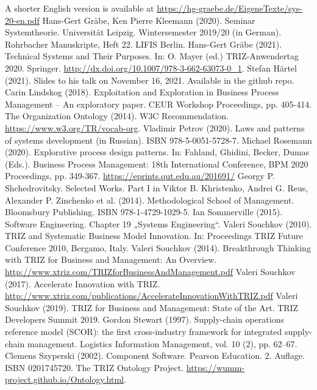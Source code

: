 \documentclass[11pt,a4paper]{article}
\begin{document}
\begin{thebibliography}{xxx}
  A shorter English version is available at
  \url{https://hg-graebe.de/EigeneTexte/sys-20-en.pdf}
 Hans-Gert Gräbe, Ken Pierre Kleemann (2020). Seminar
  Systemtheorie. Universität Leipzig. Wintersemester 2019/20 (in German).
  Rohrbacher Manuskripte, Heft 22. LIFIS Berlin.
 Hans-Gert Gräbe (2021). Technical Systems and Their
  Purposes. In: O. Mayer (ed.) TRIZ-Anwendertag 2020. Springer.
  \url{http://dx.doi.org/10.1007/978-3-662-63073-0_1}.
 Stefan Härtel (2021). Slides to his talk on November 16,
  2021.  Available in the github repo.
 Carin Lindskog (2018). Exploitation and Exploration in
  Business Process Management – An exploratory paper. CEUR Workshop
  Proceedings, pp. 405-414.
 The Organization Ontology (2014). W3C Recommendation.
  \url{https://www.w3.org/TR/vocab-org}.
 Vladimir Petrov (2020). Laws and patterns of systems
  development (in Russian). ISBN 978-5-0051-5728-7.
 Michael Rosemann (2020). Explorative process design
  patterns. In: Fahland, Ghidini, Becker, Dumas (Eds.). Business Process
  Management: 18th International Conference, BPM 2020 Proceedings,
  pp. 349-367. \url{https://eprints.qut.edu.au/201691/}
 Georgy P. Shchedrovitsky. Selected Works. Part I in Viktor
  B. Khristenko, Andrei G. Reus, Alexander P. Zinchenko et al. (2014).
  Methodological School of Management. Bloomsbury Publishing.  ISBN
  978-1-4729-1029-5.
 Ian Sommerville (2015). Software Engineering.
  Chapter 19 „Systems Engineering“.
 Valeri Souchkov (2010). TRIZ and Systematic Business
  Model Innovation.  In: Proceedings TRIZ Future Conference 2010, Bergamo,
  Italy.
 Valeri Souchkov (2014). Breakthrough Thinking with TRIZ
  for Business and Management: An Overview.
  \url{http://www.xtriz.com/TRIZforBusinessAndManagement.pdf}
 Valeri Souchkov (2017). Accelerate Innovation with
  TRIZ.
  \url{http://www.xtriz.com/publications/AccelerateInnovationWithTRIZ.pdf}
 Valeri Souchkov (2019).  TRIZ for Business and
  Management: State of the Art.  TRIZ Developers Summit 2019.
 Gordon Stewart (1997). Supply-chain operations reference
  model (SCOR): the first cross-industry framework for integrated supply-chain
  management. Logistics Information Management, vol. 10 (2), pp. 62–67.
 Clemens Szyperski (2002). Component Software. Pearson
  Education.  2. Auf\-lage.  ISBN 0201745720.
 The TRIZ Ontology Project.
  \url{https://wumm-project.github.io/Ontology.html}.
\end{thebibliography}
\end{document}
